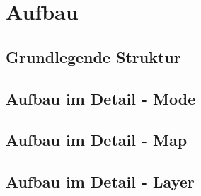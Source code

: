 \section{Aufbau}
    \subsection{Grundlegende Struktur}
    \subsection{Aufbau im Detail - Mode}
        

    \subsection{Aufbau im Detail - Map}


    \subsection{Aufbau im Detail - Layer}
    